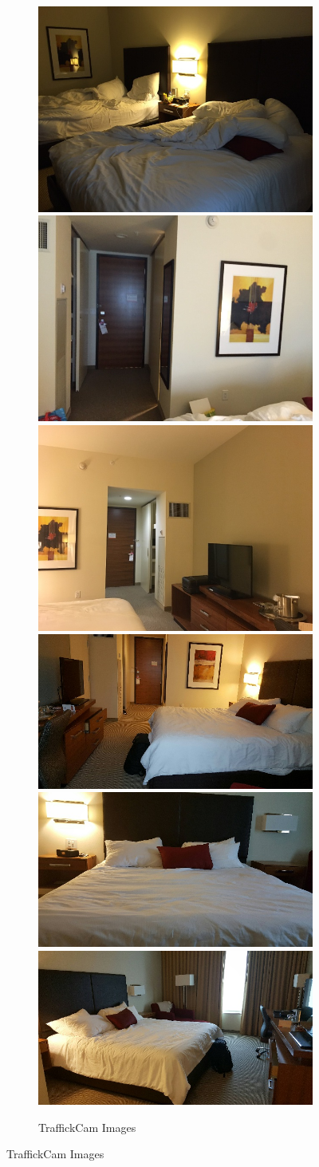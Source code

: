 \begin{figure}[ht!]
\begin{center}
  \begin{subfigure}[b]{\textwidth}
    \centering
    ~~~~~~~\includegraphics[width=.25\columnwidth]{figures/chapter2/traffickCamIms/1.jpg}
    \includegraphics[width=.25\columnwidth]{figures/chapter2/traffickCamIms/2.jpg}
    \includegraphics[width=.25\columnwidth]{figures/chapter2/traffickCamIms/3.jpg}
    \newline
    \includegraphics[width=.25\columnwidth]{figures/chapter2/traffickCamIms/4.jpg}
    \includegraphics[width=.25\columnwidth]{figures/chapter2/traffickCamIms/5.jpg}  
    \includegraphics[width=.25\columnwidth]{figures/chapter2/traffickCamIms/6.jpg}  
    \caption{TraffickCam Images}
  \end{subfigure}
  

\end{center}
\end{figure}
